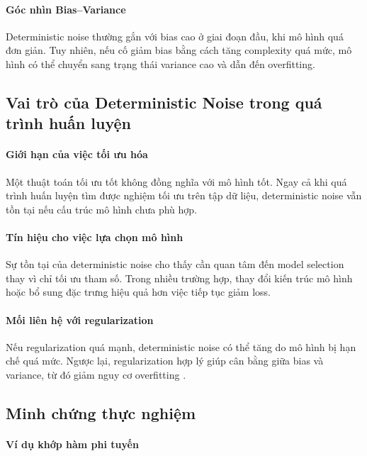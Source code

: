 \paragraph{Góc nhìn Bias--Variance}

Deterministic noise thường gắn với bias cao ở giai đoạn đầu, khi mô hình quá đơn giản. Tuy nhiên, nếu cố giảm bias bằng cách tăng complexity quá mức, mô hình có thể chuyển sang trạng thái variance cao và dẫn đến overfitting.

\subsection{Vai trò của Deterministic Noise trong quá trình huấn luyện}

\paragraph{Giới hạn của việc tối ưu hóa}

Một thuật toán tối ưu tốt không đồng nghĩa với mô hình tốt. Ngay cả khi quá trình huấn luyện tìm được nghiệm tối ưu trên tập dữ liệu, deterministic noise vẫn tồn tại nếu cấu trúc mô hình chưa phù hợp.

\paragraph{Tín hiệu cho việc lựa chọn mô hình}

Sự tồn tại của deterministic noise cho thấy cần quan tâm đến model selection thay vì chỉ tối ưu tham số. Trong nhiều trường hợp, thay đổi kiến trúc mô hình hoặc bổ sung đặc trưng hiệu quả hơn việc tiếp tục giảm loss.

\paragraph{Mối liên hệ với regularization}

Nếu regularization quá mạnh, deterministic noise có thể tăng do mô hình bị hạn chế quá mức. Ngược lại, regularization hợp lý giúp cân bằng giữa bias và variance, từ đó giảm nguy cơ overfitting \cite{Ying2019}.

\subsection{Minh chứng thực nghiệm}

\paragraph{Ví dụ khớp hàm phi tuyến}

